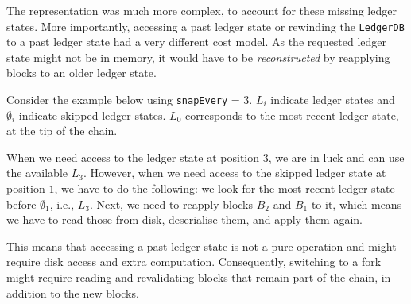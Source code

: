 The representation was much more complex, to account for these missing ledger
states. More importantly, accessing a past ledger state or rewinding the
\lstinline!LedgerDB! to a past ledger state had a very different cost model. As
the requested ledger state might not be in memory, it would have to be
\emph{reconstructed} by reapplying blocks to an older ledger state.

Consider the example below using \lstinline!snapEvery! = 3. $L_i$ indicate
ledger states and $\emptyset_i$ indicate skipped ledger states. $L_0$ corresponds to the
most recent ledger state, at the tip of the chain.
%
\begin{center}
\end{center}
%
When we need access to the ledger state at position $3$, we are in luck and can
use the available $L_3$. However, when we need access to the skipped ledger
state at position $1$, we have to do the following: we look for the most recent
ledger state before $\emptyset_1$, i.e., $L_3$. Next, we need to reapply blocks $B_2$
and $B_1$ to it, which means we have to read those from disk, deserialise them,
and apply them again.

This means that accessing a past ledger state is not a pure operation and might
require disk access and extra computation. Consequently, switching to a fork
might require reading and revalidating blocks that remain part of the chain, in
addition to the new blocks.

